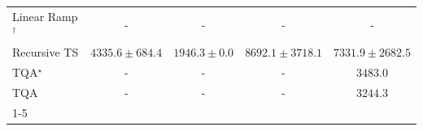 \begin{tabular}{l|cccc|}
Linear Ramp$^\dagger$ & {\cellcolor[HTML]{000000}} \color[HTML]{F1F1F1} {\cellcolor{white}} \color{black} - & {\cellcolor[HTML]{000000}} \color[HTML]{F1F1F1} {\cellcolor{white}} \color{black} - & {\cellcolor[HTML]{000000}} \color[HTML]{F1F1F1} {\cellcolor{white}} \color{black} - & {\cellcolor[HTML]{000000}} \color[HTML]{F1F1F1} {\cellcolor{white}} \color{black} - \\
Recursive TS & {\cellcolor[HTML]{A7BDDB}} \color[HTML]{000000} $4335.6\pm 684.4$ & {\cellcolor[HTML]{F8F1F8}} \color[HTML]{000000} $1946.3\pm 0.0$ & {\cellcolor[HTML]{034267}} \color[HTML]{F1F1F1} $8692.1\pm 3718.1$ & {\cellcolor[HTML]{056BA7}} \color[HTML]{F1F1F1} $7331.9\pm 2682.5$ \\
TQA$^\star$ & {\cellcolor[HTML]{000000}} \color[HTML]{F1F1F1} {\cellcolor{white}} \color{black} - & {\cellcolor[HTML]{000000}} \color[HTML]{F1F1F1} {\cellcolor{white}} \color{black} - & {\cellcolor[HTML]{000000}} \color[HTML]{F1F1F1} {\cellcolor{white}} \color{black} - & {\cellcolor[HTML]{CDD0E5}} \color[HTML]{000000} $3483.0$ \\
TQA & {\cellcolor[HTML]{000000}} \color[HTML]{F1F1F1} {\cellcolor{white}} \color{black} - & {\cellcolor[HTML]{000000}} \color[HTML]{F1F1F1} {\cellcolor{white}} \color{black} - & {\cellcolor[HTML]{000000}} \color[HTML]{F1F1F1} {\cellcolor{white}} \color{black} - & {\cellcolor[HTML]{D6D6E9}} \color[HTML]{000000} $3244.3$ \\
\cline{1-5}
\bottomrule
\end{tabular}
